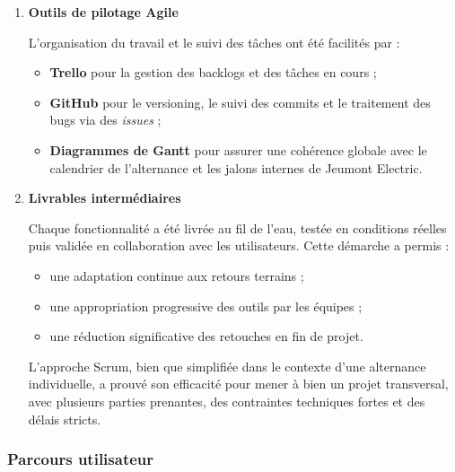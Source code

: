 \documentclass[11pt,a4paper]{article}
\begin{document}
\begin{enumerate}
\item \textbf{Outils de pilotage Agile}

L'organisation du travail et le suivi des tâches ont été facilités par :
\begin{itemize}
    \item \textbf{Trello} pour la gestion des backlogs et des tâches en cours ;
    \item \textbf{GitHub} pour le versioning, le suivi des commits et le traitement des bugs via des \textit{issues} ;
    \item \textbf{Diagrammes de Gantt} pour assurer une cohérence globale avec le calendrier de l’alternance et les jalons internes de Jeumont Electric.
\end{itemize}

\item \textbf{Livrables intermédiaires}

Chaque fonctionnalité a été livrée au fil de l’eau, testée en conditions réelles puis validée en collaboration avec les utilisateurs. Cette démarche a permis :
\begin{itemize}
    \item une adaptation continue aux retours terrains ;
    \item une appropriation progressive des outils par les équipes ;
    \item une réduction significative des retouches en fin de projet.
\end{itemize}

L’approche Scrum, bien que simplifiée dans le contexte d’une alternance individuelle, a prouvé son efficacité pour mener à bien un projet transversal, avec plusieurs parties prenantes, des contraintes techniques fortes et des délais stricts.
\end{enumerate}


\subsubsection{Parcours utilisateur}
\end{document}
